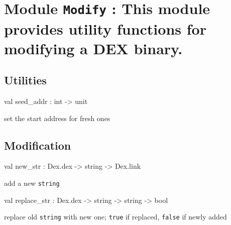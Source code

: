 \documentclass[11pt]{article}
\begin{document}
\section{Module {\tt{Modify}} : This module provides utility functions for modifying a DEX binary.}
\label{module:Modify}




\ocamldocvspace{0.5cm}



\subsection{Utilities}




\label{val:Modify.seed-underscoreaddr}\begin{ocamldoccode}
val seed_addr : int -> unit
\end{ocamldoccode}
\begin{ocamldocdescription}
set the start address for fresh ones


\end{ocamldocdescription}




\subsection{Modification}




\label{val:Modify.new-underscorestr}\begin{ocamldoccode}
val new_str : Dex.dex -> string -> Dex.link
\end{ocamldoccode}
\begin{ocamldocdescription}
add a new {\tt{string}}


\end{ocamldocdescription}




\label{val:Modify.replace-underscorestr}\begin{ocamldoccode}
val replace_str : Dex.dex -> string -> string -> bool
\end{ocamldoccode}
\begin{ocamldocdescription}
replace old {\tt{string}} with new one;
 {\tt{true}} if replaced, {\tt{false}} if newly added


\end{ocamldocdescription}
\end{document}
